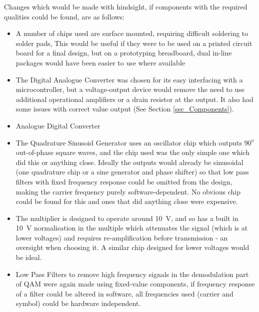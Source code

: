 \documentclass[../main.tex]{subfiles}
\begin{document}
Changes which would be made with hindsight, if components with the required qualities could be found, are as follows:

\begin{itemize}
	\item A number of chips used are surface mounted, requiring difficult soldering to solder pads, This would be useful if they were to be used on a printed circuit board for a final design, but on a prototyping breadboard, dual in-line packages would have been easier to use where available
	\item The Digital Analogue Converter was chosen for its easy interfacing with a microcontroller, but a voltage-output device would remove the need to use additional operational amplifiers or a drain resistor at the output. It also had some issues with correct value output (See Section \ref{sec_Components}).
	\item Analogue Digital Converter
	\item The Quadrature Sinusoid Generator uses an oscillator chip which outputs $90^o$ out-of-phase square waves, and the chip used was the only simple one which did this or anything close. Ideally the outputs would already be sinusoidal (one quadrature chip or a sine generator and phase shifter) so that low pass filters with fixed frequency response could be omitted from the design, making the carrier frequency purely software-dependent. No obvious chip could be found for this and ones that did anything close were expensive.
	\item The multiplier is designed to operate around \SI{10}{\volt}, and so has a built in \SI{10}{\volt} normalisation in the multiple which attenuates the signal (which is at lower voltages) and requires re-amplification before transmission - an oversight when choosing it. A similar chip designed for lower voltages would be ideal.
	\item Low Pass Filters to remove high frequency signals in the demodulation part of QAM were again made using fixed-value components, if frequency response of a filter could be altered in software, all frequencies used (carrier and symbol) could be hardware independent.
\end{itemize}
\end{document}

